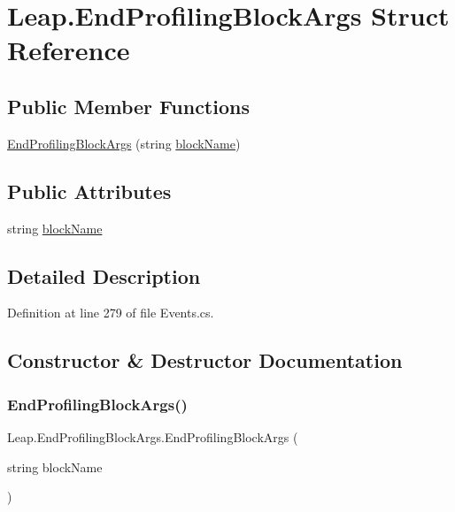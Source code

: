 \hypertarget{struct_leap_1_1_end_profiling_block_args}{}\section{Leap.\+End\+Profiling\+Block\+Args Struct Reference}
\label{struct_leap_1_1_end_profiling_block_args}
\subsection*{Public Member Functions}
\begin{DoxyCompactItemize}
\item 
\mbox{\hyperlink{struct_leap_1_1_end_profiling_block_args_a4bce26acf83632cac37dd319480fa017}{End\+Profiling\+Block\+Args}} (string \mbox{\hyperlink{struct_leap_1_1_end_profiling_block_args_a5bc05bde6a49a20b69ca4d199f368b67}{block\+Name}})
\end{DoxyCompactItemize}
\subsection*{Public Attributes}
\begin{DoxyCompactItemize}
\item 
string \mbox{\hyperlink{struct_leap_1_1_end_profiling_block_args_a5bc05bde6a49a20b69ca4d199f368b67}{block\+Name}}
\end{DoxyCompactItemize}


\subsection{Detailed Description}


Definition at line 279 of file Events.\+cs.



\subsection{Constructor \& Destructor Documentation}
\mbox{\label{struct_leap_1_1_end_profiling_block_args_a4bce26acf83632cac37dd319480fa017}} 
\subsubsection{\texorpdfstring{EndProfilingBlockArgs()}{EndProfilingBlockArgs()}}
{\footnotesize\ttfamily Leap.\+End\+Profiling\+Block\+Args.\+End\+Profiling\+Block\+Args (\begin{DoxyParamCaption}\item[{string}]{block\+Name }\end{DoxyParamCaption})}



